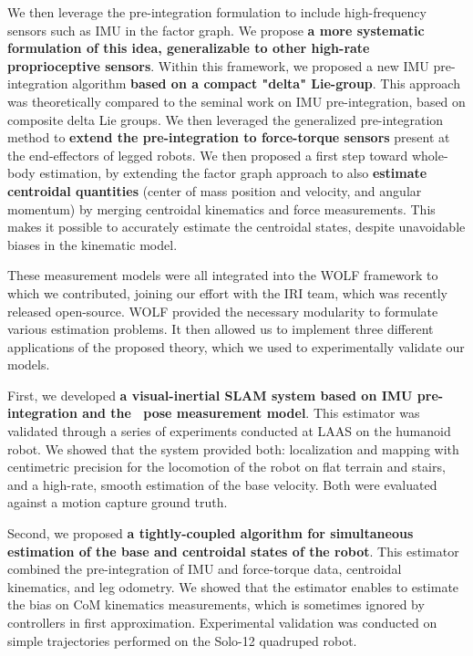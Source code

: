 We then leverage the pre-integration formulation to include high-frequency sensors such as IMU in the factor graph. We propose 
\textbf{a more systematic formulation of this idea, generalizable to other high-rate proprioceptive sensors}. Within this framework, we proposed a new 
IMU pre-integration algorithm \textbf{based on a compact "delta" Lie-group}.
This approach was theoretically compared to the seminal work on IMU pre-integration, based on composite delta Lie groups. 
We then leveraged the generalized pre-integration method to \textbf{extend the pre-integration to force-torque sensors} present at the end-effectors of
legged robots. 
We then proposed a first step toward whole-body estimation, by extending the factor graph approach to also \textbf{estimate centroidal quantities}
(center of mass position and velocity, and angular momentum) by merging centroidal kinematics and force measurements. This makes it possible 
to accurately estimate the centroidal states, despite unavoidable biases in the kinematic model. 


These measurement models were all integrated into the WOLF framework \cite{sola2021wolf} to which we contributed, joining our effort with the IRI team, 
which was recently released open-source. WOLF provided the necessary modularity to formulate various estimation problems. 
It then allowed us to implement three different applications of the proposed theory, which we used to experimentally validate our models.

\bigskip

First, we developed \textbf{a visual-inertial SLAM system based on IMU pre-integration and the \apriltag\ pose measurement model}. This estimator was validated through
a series of experiments conducted at LAAS on the  humanoid robot. We showed that the system provided both: localization and mapping with centimetric precision
for the locomotion of the robot on flat terrain and stairs, and a high-rate, smooth estimation of the base velocity. Both were evaluated against a motion capture 
ground truth. 

Second, we proposed \textbf{a tightly-coupled algorithm for simultaneous estimation of the base and centroidal states of the robot}. This estimator combined the pre-integration 
of IMU and force-torque data, centroidal kinematics, and leg odometry. We showed that the estimator enables to estimate the bias on CoM kinematics measurements, which is sometimes ignored
by controllers in first approximation. Experimental validation was conducted on simple trajectories performed on the Solo-12 quadruped robot. 

